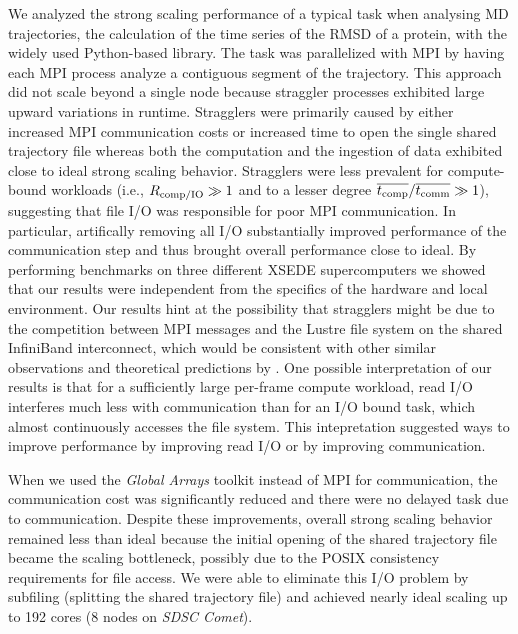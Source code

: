 \label{sec:conclusions}

We analyzed the strong scaling performance of a typical task when analysing MD trajectories, the calculation of the time series of the RMSD of a protein, with the widely used Python-based  library.
The task was parallelized with MPI by having each MPI process analyze a contiguous segment of the trajectory.
This approach did not scale beyond a single node because straggler processes exhibited large upward variations in runtime.
Stragglers were primarily caused by either increased MPI communication costs or increased time to open the single shared trajectory file whereas both the computation and the ingestion of data exhibited close to ideal strong scaling behavior.
Stragglers were less prevalent for compute-bound workloads (i.e., $R_{\text{comp/IO}} \gg 1$ and to a lesser degree $\overline{{t}_{\text{comp}}}/\overline{t_{\text{comm}}} \gg 1$), suggesting that file I/O was responsible for poor MPI communication.
In particular, artifically removing all I/O substantially improved performance of the communication step and thus brought overall performance close to ideal.
By performing benchmarks on three different XSEDE supercomputers we showed that our results were independent from the specifics of the hardware and local environment.
Our results hint at the possibility that stragglers might be due to the competition between MPI messages and the Lustre file system on the shared InfiniBand interconnect, which would be consistent with other similar observations \cite{VMD2013} and theoretical predictions by \citet{Brown:2018ab}.
One possible interpretation of our results is that for a sufficiently large per-frame compute workload, read I/O interferes much less with communication than for an I/O bound task, which almost continuously accesses the file system.
This intepretation suggested ways to improve performance by improving read I/O or by improving communication.

When we used the {\em Global Arrays\/} toolkit instead of MPI for communication, the communication cost was significantly reduced and there were no delayed task due to communication.
Despite these improvements, overall strong scaling behavior remained less than ideal because the initial opening of the shared trajectory file became the scaling bottleneck, possibly due to the POSIX consistency requirements for file access.
We were able to eliminate this I/O problem by subfiling (splitting the shared trajectory file) and achieved nearly ideal scaling up to 192 cores (8 nodes on \emph{SDSC Comet}).

